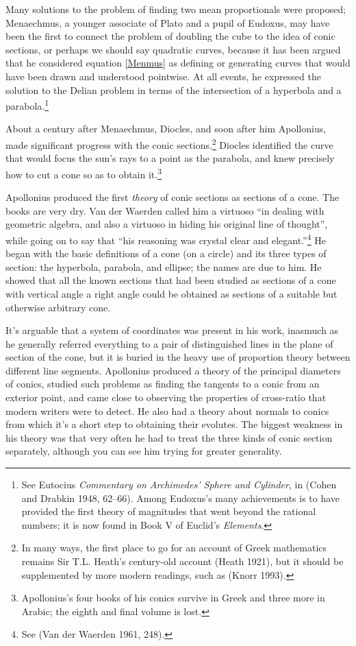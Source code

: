 Many solutions to the problem of finding two mean proportionals were proposed; Menaechmus, a younger associate of Plato and a pupil of Eudoxus, may have been the first to connect the problem of doubling the cube to the idea of conic sections, or perhaps we should say quadratic curves, because it has been argued that he considered equation \eqref{Menmus} as defining or generating curves that would have been drawn and understood pointwise. At all events, he expressed the solution to the Delian problem in terms of the intersection of a hyperbola and a parabola.\footnote{See Eutocius \emph{Commentary on Archimedes' Sphere and Cylinder}, in (Cohen and Drabkin 1948, 62--66). Among Eudoxus's many achievements is to have provided the first theory of magnitudes that went beyond the rational numbers; it is now found in Book V of Euclid's \emph{Elements}.}

About a century after Menaechmus, Diocles, and soon after him Apollonius, made significant progress with the conic sections.\footnote{In many ways, the first place to go for an account of Greek mathematics remains Sir T.L. Heath's century-old account (Heath 1921), but it should be supplemented by more modern readings, such as (Knorr  1993).}
Diocles identified the curve that would focus the sun's rays to a point as the parabola, and knew precisely how to cut a cone so as to obtain it.\footnote{Apollonius's four books of his conics survive in Greek and three more in Arabic; the eighth and final volume is lost.} 


Apollonius produced the first \emph{theory} of conic sections as sections of a cone. 
The books are very dry. Van der Waerden called him a virtuoso ``in dealing with geometric algebra, and also a virtuoso in hiding his original line of thought'', while going on to say that ``his reasoning was crystal clear and elegant.''\footnote{See (Van der Waerden 1961, 248).}
He began with the basic definitions of a cone (on a circle) and its three types of section: the hyperbola, parabola, and ellipse; the names are due to him. He showed that all the known sections that had been studied as sections of a cone with vertical angle a right angle could be obtained as sections of a suitable but otherwise arbitrary cone.

It's  arguable that a system of coordinates was present in his work, inasmuch as he generally referred everything to a pair of distinguished lines in the plane of section of the cone, but it is buried in the heavy use of proportion theory between different line segments. 
Apollonius produced a theory of the principal diameters of conics, studied such problems as finding the tangents to a conic from an exterior point, and came close to observing the properties of cross-ratio that modern writers were to detect. He also had a theory about normals to conics from which  it's a short step to obtaining their evolutes. 
The biggest weakness in his theory was that very often he had to treat the three kinds of conic section separately, although you can see him trying for greater generality. 




